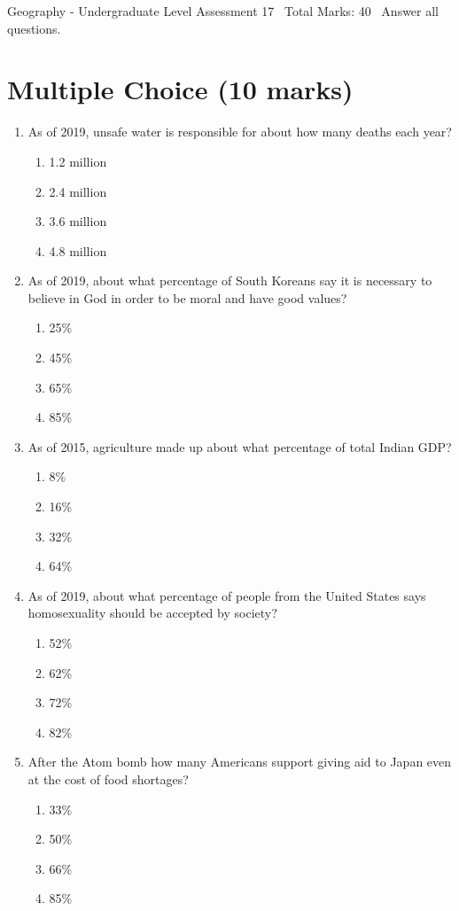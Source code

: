 \documentclass[12pt]{article}
\begin{document}
\begin{center}
Geography - Undergraduate Level Assessment 17 \
Total Marks: 40 \
Answer all questions.
\end{center}

\section*{Multiple Choice (10 marks)}
\begin{enumerate}[label=\arabic*.]
\item As of 2019, unsafe water is responsible for about how many deaths each year?
\begin{enumerate}[label=(\alph*)]
    \item 1.2 million
    \item 2.4 million
    \item 3.6 million
    \item 4.8 million
\end{enumerate}
\item As of 2019, about what percentage of South Koreans say it is necessary to believe in God in order to be moral and have good values?
\begin{enumerate}[label=(\alph*)]
    \item 25\%
    \item 45\%
    \item 65\%
    \item 85\%
\end{enumerate}
\item As of 2015, agriculture made up about what percentage of total Indian GDP?
\begin{enumerate}[label=(\alph*)]
    \item 8\%
    \item 16\%
    \item 32\%
    \item 64\%
\end{enumerate}
\item As of 2019, about what percentage of people from the United States says homosexuality should be accepted by society?
\begin{enumerate}[label=(\alph*)]
    \item 52\%
    \item 62\%
    \item 72\%
    \item 82\%
\end{enumerate}
\item After the Atom bomb how many Americans support giving aid to Japan even at the cost of food shortages?
\begin{enumerate}[label=(\alph*)]
    \item 33\%
    \item 50\%
    \item 66\%
    \item 85\%
\end{enumerate}
\end{enumerate}
\end{document}
